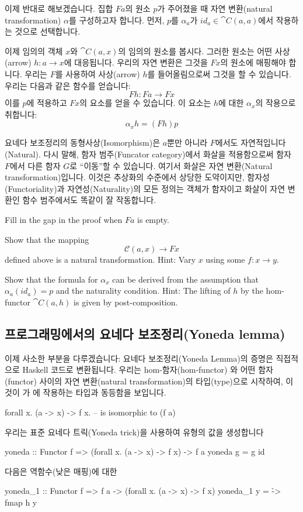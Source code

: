 \documentclass[DaoFP]{subfiles}
\begin{document}
이제 반대로 해보겠습니다. 집합 $F a$의 원소 $p$가 주어졌을 때 자연 변환(natural transformation) $\alpha$를 구성하고자 합니다. 먼저, $p$를 $\alpha_a$가 $id_a \in \cat C(a, a)$에서 작용하는 것으로 선택합니다.

이제 임의의 객체 $x$와 $\cat C(a, x)$의 임의의 원소를 봅시다. 그러한 원소는 어떤 사상(arrow) $h \colon a \to x$에 대응됩니다. 우리의 자연 변환은 그것을 $F x$의 원소에 매핑해야 합니다. 우리는 $F$를 사용하여 사상(arrow) $h$를 들어올림으로써 그것을 할 수 있습니다. 우리는 다음과 같은 함수를 얻습니다:
\[F h \colon F a \to F x \]
이를 $p$에 적용하고 $F x$의 요소를 얻을 수 있습니다. 이 요소는 $h$에 대한 $\alpha_x$의 작용으로 취합니다:
\[ \alpha_x h = (F h) p \]

요네다 보조정리의 동형사상(Isomorphism)은 $a$뿐만 아니라 $F$에서도 자연적입니다(Natural). 다시 말해, 함자 범주(Funcator category)에서 화살을 적용함으로써 함자 $F$에서 다른 함자 $G$로 ``이동''할 수 있습니다. 여기서 화살은 자연 변환(Natural transformation)입니다. 이것은 추상화의 수준에서 상당한 도약이지만, 함자성(Functoriality)과 자연성(Naturality)의 모든 정의는 객체가 함자이고 화살이 자연 변환인 함수 범주에서도 똑같이 잘 작동합니다.

\begin{exercise}
Fill in the gap in the proof when $F a$ is empty.
\end{exercise}
\begin{exercise}
Show that the mapping 
\[ \mathcal{C}(a, x) \to F x\]
defined above is a natural transformation. Hint: Vary $x$ using some $f \colon x \to y$.
\end{exercise}
\begin{exercise}
Show that the formula for $\alpha_x$ can be derived from the assumption that $\alpha_a (id_a) = p$ and the naturality condition. Hint: The lifting of $h$ by the hom-functor $\cat C(a, h)$ is given by post-composition.
\end{exercise}

\subsection{프로그래밍에서의 요네다 보조정리(Yoneda lemma)}

이제 사소한 부분을 다루겠습니다: 요네다 보조정리(Yoneda Lemma)의 증명은 직접적으로 Haskell 코드로 변환됩니다. 우리는 hom-함자(hom-functor) 와 어떤 함자(functor)  사이의 자연 변환(natural transformation)의 타입(type)으로 시작하여, 이것이 가 에 작용하는 타입과 동등함을 보입니다.
\begin{haskell}
forall x. (a -> x) -> f x.   -- is isomorphic to (f a)
\end{haskell}
우리는 표준 요네다 트릭(Yoneda trick)을 사용하여  유형의 값을 생성합니다
\begin{haskell}
yoneda :: Functor f => (forall x. (a -> x) -> f x) -> f a
yoneda g = g id
\end{haskell}
다음은 역함수(낮은 매핑)에 대한 
\begin{haskell}
yoneda_1 :: Functor f => f a -> (forall x. (a -> x) -> f x)
yoneda_1 y = \h -> fmap h y
\end{haskell}
\end{document}
